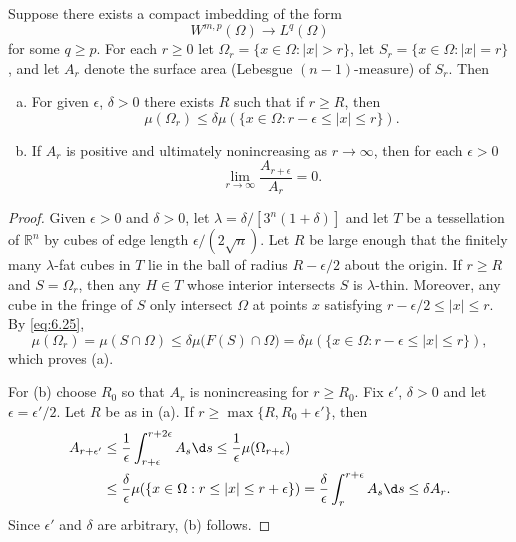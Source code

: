 \begin{theorem}
  Suppose there exists a compact imbedding of the form
  \begin{equation}\label{eq:6.26}
    W^{m,p}(\Omega) \to L^q(\Omega)
  \end{equation}
  for some $q\geq p$. For each $r\geq 0$ let $\Omega_r = \{x\in\Omega:|x|>r\}$,
  let $S_r = \{x\in\Omega:|x|=r\}$, and let $A_r$ denote the surface area
  (Lebesgue $(n-1)$-measure) of $S_r$. Then
  \begin{enumerate}[(a)]
    \item For given $\epsilon$, $\delta>0$ there exists $R$ such that
      if $r\geq R$, then
      \[ \mu(\Omega_r) \leq \delta \mu(\{x\in\Omega: r-\epsilon\leq |x|\leq r\}). \]
    \item If $A_r$ is positive and ultimately nonincreasing as $r\to\infty$,
      then for each $\epsilon>0$
      \[ \lim_{r\to\infty} \frac{A_{r+\epsilon}}{A_r} = 0. \]
  \end{enumerate}
\end{theorem}

\begin{proof}
  Given $\epsilon>0$ and $\delta>0$, let $\lambda=\delta/[3^n(1+\delta)]$
  and let $T$ be a tessellation of $\mathbb{R}^n$ by cubes of edge
  length $\epsilon/(2\sqrt{n})$. Let $R$ be large enough that the finitely
  many $\lambda$-fat cubes in $T$ lie in the ball of radius $R-\epsilon/2$
  about the origin. If $r\geq R$ and $S=\Omega_r$, then any $H\in T$
  whose interior intersects $S$ is $\lambda$-thin. Moreover, any cube in the
  fringe of $S$ only intersect $\Omega$ at points $x$ satisfying 
  $r-\epsilon/2\leq |x|\leq r$. By \eqref{eq:6.25},
  \[ \mu(\Omega_r) = \mu(S\cap\Omega) \leq \delta\mu\bigl(F(S)\cap\Omega\bigr)
      = \delta\mu(\{x\in\Omega: r-\epsilon\leq |x|\leq r\}), \]
  which proves (a).

  For (b) choose $R_0$ so that $A_r$ is nonincreasing for $r\geq R_0$.
  Fix $\epsilon'$, $\delta>0$ and let $\epsilon=\epsilon'/2$.
  Let $R$ be as in (a). If $r\geq \max\{R,R_0+\epsilon'\}$, then
  \begin{align*}
    A_{r+\epsilon'}
    & \leq \frac{1}{\epsilon} \int_{r+\epsilon}^{r+2\epsilon} A_s \d s
      \leq \frac{1}{\epsilon} \mu(\Omega_{r+\epsilon}) \\
    & \leq \frac{\delta}{\epsilon} \mu(\{x\in\Omega: r\leq |x|\leq r+\epsilon\})
      = \frac{\delta}{\epsilon} \int_r^{r+\epsilon} A_s \d s \leq \delta A_r.
  \end{align*}
  Since $\epsilon'$ and $\delta$ are arbitrary, (b) follows.
\end{proof}


